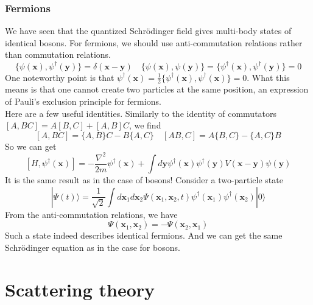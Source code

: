 \documentclass[cyan]{elegantnote}
\begin{document}
\subsection{Fermions}
We have seen that the quantized Schrödinger field gives multi-body states of identical bosons. For fermions, we should use anti-commutation relations rather than commutation relations.
\[\{\psi(\bm{x}),\psi^{\dagger}(\bm{y})\} = \delta(\bm{x}-\bm{y}) \quad \{\psi(\bm{x}),\psi(\bm{y})\} = \{\psi^{\dagger}(\bm{x}),\psi^{\dagger}(\bm{y})\} = 0\]
One noteworthy point is that $\psi^{\dagger}(\bm{x}) = \frac{1}{2}\{\psi^{\dagger}(\bm{x}),\psi^{\dagger}(\bm{x})\} = 0$. 
What this means is that one cannot create two particles at the same position, an expression of Pauli's exclusion principle for fermions.\\
Here are a few useful identities. Similarly to the identity of commutators $[A,BC] = A[B,C] + [A,B]C$, we find
\[[A,BC] = \{A,B\}C - B\{A,C\} \quad [AB,C] = A\{B,C\} - \{A,C\}B\]
So we can get
\[[H,\psi^{\dagger}(\bm{x})] = -\frac{\nabla^2}{2m}\psi^{\dagger}(\bm{x}) + \int d\bm{y} \psi^{\dagger}(\bm{x}) \psi^{\dagger}(\bm{y})V(\bm{x}-\bm{y})\psi(\bm{y})\]
It is the same result as in the case of bosons!
Consider a two-particle state
\[|\Psi(t)\rangle = \frac{1}{\sqrt{2}} \int d\bm{x}_1 d\bm{x}_2 \Psi(\bm{x}_1,\bm{x}_2,t) \psi^{\dagger}(\bm{x}_1)\psi^{\dagger}(\bm{x}_2) |0\rangle\]
From the anti-commutation relations, we have
\[\Psi(\bm{x}_1,\bm{x}_2) = - \Psi(\bm{x}_2,\bm{x}_1)\]
Such a state indeed describes identical fermions. And we can get the same Schrödinger equation as in the case for bosons.

\chapter{Scattering theory}
\end{document}
